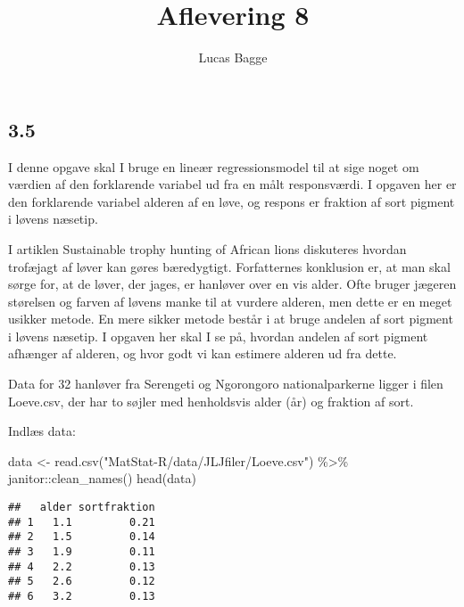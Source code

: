 \documentclass[
]{article}
\title{Aflevering 8}
\subtitle{Lucas Bagge}
\author{}
\date{\vspace{-2.5em}}
\newenvironment{Shaded}{\begin{snugshade}}{\end{snugshade}}
\newcommand{\FunctionTok}[1]{\textcolor[rgb]{0.00,0.00,0.00}{#1}}
\newcommand{\NormalTok}[1]{#1}
\newcommand{\OtherTok}[1]{\textcolor[rgb]{0.56,0.35,0.01}{#1}}
\newcommand{\SpecialCharTok}[1]{\textcolor[rgb]{0.00,0.00,0.00}{#1}}
\newcommand{\StringTok}[1]{\textcolor[rgb]{0.31,0.60,0.02}{#1}}
\begin{document}
\maketitle

\hypertarget{section}{%
\subsection{3.5}\label{section}}

I denne opgave skal I bruge en lineær regressionsmodel til at sige noget
om værdien af den forklarende variabel ud fra en målt responsværdi. I
opgaven her er den forklarende variabel alderen af en løve, og respons
er fraktion af sort pigment i løvens næsetip.

I artiklen Sustainable trophy hunting of African lions diskuteres
hvordan trofæjagt af løver kan gøres bæredygtigt. Forfatternes
konklusion er, at man skal sørge for, at de løver, der jages, er
hanløver over en vis alder. Ofte bruger jægeren størelsen og farven af
løvens manke til at vurdere alderen, men dette er en meget usikker
metode. En mere sikker metode består i at bruge andelen af sort pigment
i løvens næsetip. I opgaven her skal I se på, hvordan andelen af sort
pigment afhænger af alderen, og hvor godt vi kan estimere alderen ud fra
dette.

Data for 32 hanløver fra Serengeti og Ngorongoro nationalparkerne ligger
i filen Loeve.csv, der har to søjler med henholdsvis alder (år) og
fraktion af sort.

Indlæs data:

\begin{Shaded}
\begin{Highlighting}[]
\NormalTok{data }\OtherTok{\textless{}{-}} \FunctionTok{read.csv}\NormalTok{(}\StringTok{"MatStat{-}R/data/JLJfiler/Loeve.csv"}\NormalTok{) }\SpecialCharTok{\%\textgreater{}\%} 
\NormalTok{  janitor}\SpecialCharTok{::}\FunctionTok{clean\_names}\NormalTok{() }
\FunctionTok{head}\NormalTok{(data)}
\end{Highlighting}
\end{Shaded}

\begin{verbatim}
##   alder sortfraktion
## 1   1.1         0.21
## 2   1.5         0.14
## 3   1.9         0.11
## 4   2.2         0.13
## 5   2.6         0.12
## 6   3.2         0.13
\end{verbatim}
\end{document}
